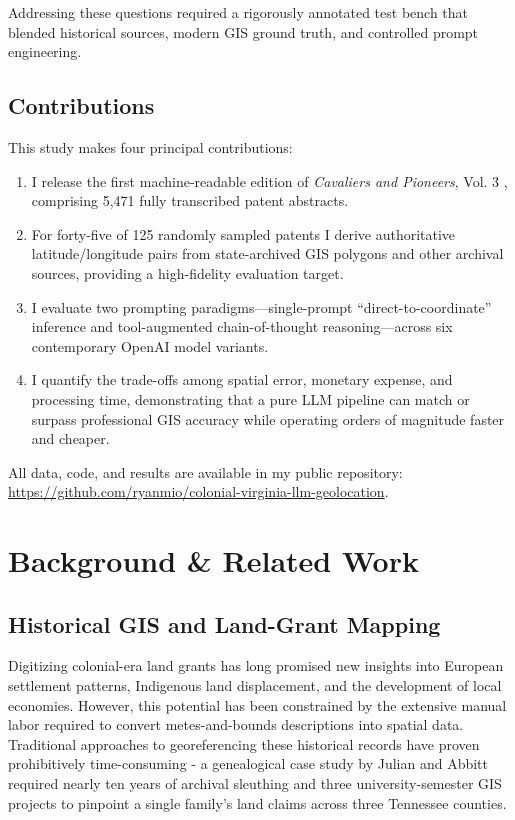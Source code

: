 Addressing these questions required a rigorously annotated test bench
that blended historical sources, modern GIS ground truth, and controlled
prompt engineering.

\subsection{Contributions}\label{contributions}

This study makes four principal contributions:

\begin{enumerate}
\def\labelenumi{\arabic{enumi}.}
\tightlist
\item
  I release the first machine-readable edition of \emph{Cavaliers and
  Pioneers}, Vol. 3 \citep{Nugent1979_cavaliers3}, comprising 5,471
  fully transcribed patent abstracts.\\
\item
  For forty-five of 125 randomly sampled patents I derive authoritative
  latitude/longitude pairs from state-archived GIS polygons and other
  archival sources, providing a high-fidelity evaluation target.\\
\item
  I evaluate two prompting paradigms---single-prompt
  ``direct-to-coordinate'' inference and tool-augmented chain-of-thought
  reasoning---across six contemporary OpenAI model variants.\\
\item
  I quantify the trade-offs among spatial error, monetary expense, and
  processing time, demonstrating that a pure LLM pipeline can match or
  surpass professional GIS accuracy while operating orders of magnitude
  faster and cheaper.
\end{enumerate}

All data, code, and results are available in my public repository:
\url{https://github.com/ryanmio/colonial-virginia-llm-geolocation}.

\section{Background \& Related Work}\label{background-related-work}

\subsection{Historical GIS and Land-Grant
Mapping}\label{historical-gis-and-land-grant-mapping}

Digitizing colonial-era land grants has long promised new insights into
European settlement patterns, Indigenous land displacement, and the
development of local economies. However, this potential has been
constrained by the extensive manual labor required to convert
metes-and-bounds descriptions into spatial data. Traditional approaches
to georeferencing these historical records have proven prohibitively
time-consuming - a genealogical case study by Julian and Abbitt
\citep{Julian2014_tennessee} required nearly ten years of archival
sleuthing and three university-semester GIS projects to pinpoint a
single family's land claims across three Tennessee counties.

